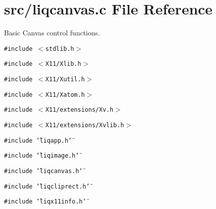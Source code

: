 \section{src/liqcanvas.c File Reference}
\label{d6/df5/liqcanvas_8c}
Basic Canvas control functions.  


{\tt \#include $<$stdlib.h$>$}\par
{\tt \#include $<$X11/Xlib.h$>$}\par
{\tt \#include $<$X11/Xutil.h$>$}\par
{\tt \#include $<$X11/Xatom.h$>$}\par
{\tt \#include $<$X11/extensions/Xv.h$>$}\par
{\tt \#include $<$X11/extensions/Xvlib.h$>$}\par
{\tt \#include \char`\"{}liqapp.h\char`\"{}}\par
{\tt \#include \char`\"{}liqimage.h\char`\"{}}\par
{\tt \#include \char`\"{}liqcanvas.h\char`\"{}}\par
{\tt \#include \char`\"{}liqcliprect.h\char`\"{}}\par
{\tt \#include \char`\"{}liqx11info.h\char`\"{}}\par
